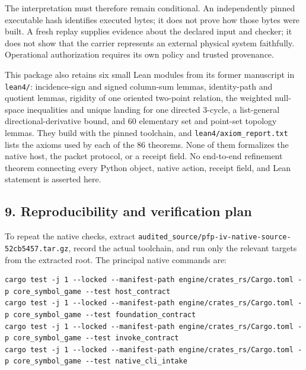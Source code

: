 \documentclass[
  11pt,
]{article}
\newcommand{\passthrough}[1]{#1}
\begin{document}
The interpretation must therefore remain conditional. An independently
pinned executable hash identifies executed bytes; it does not prove how
those bytes were built. A fresh replay supplies evidence about the
declared input and checker; it does not show that the carrier represents
an external physical system faithfully. Operational authorization
requires its own policy and trusted provenance.

This package also retains six small Lean modules from its former
manuscript in \passthrough{\lstinline!lean4/!}: incidence-sign and
signed column-sum lemmas, identity-path and quotient lemmas, rigidity of
one oriented two-point relation, the weighted null-space inequalities
and unique landing for one directed 3-cycle, a list-general
directional-derivative bound, and 60 elementary set and point-set
topology lemmas. They build with the pinned toolchain, and
\nolinkurl{lean4/axiom_report.txt} lists the axioms used by each of the
86 theorems. None of them formalizes the native host, the packet
protocol, or a receipt field. No end-to-end refinement theorem
connecting every Python object, native action, receipt field, and Lean
statement is asserted here.

\subsection{9. Reproducibility and verification
plan}\label{reproducibility-and-verification-plan}

To repeat the native checks, extract
\nolinkurl{audited_source/pfp-iv-native-source-52cb5457.tar.gz}, record
the actual toolchain, and run only the relevant targets from the
extracted root. The principal native commands are:

\begin{lstlisting}
cargo test -j 1 --locked --manifest-path engine/crates_rs/Cargo.toml -p core_symbol_game --test host_contract
cargo test -j 1 --locked --manifest-path engine/crates_rs/Cargo.toml -p core_symbol_game --test foundation_contract
cargo test -j 1 --locked --manifest-path engine/crates_rs/Cargo.toml -p core_symbol_game --test invoke_contract
cargo test -j 1 --locked --manifest-path engine/crates_rs/Cargo.toml -p core_symbol_game --test native_cli_intake
\end{lstlisting}
\end{document}
